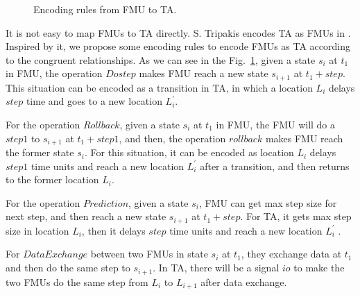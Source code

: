 \begin{figure}[htbp]
	\caption{Encoding rules from FMU to TA.}
	\label{fmutota}
\end{figure}

It is not easy to map FMUs to TA directly. S. Tripakis encodes TA as FMUs in \cite{Tripakis15}. Inspired by it, we propose some encoding rules to encode FMUs as TA according to the congruent relationships. As we can see in the Fig.~\ref{fmutota}, given a state $s_{i}$ at $t_{1}$ in FMU, the operation $Dostep$ makes FMU reach a new state $s_{i+1}$ at $t_{1}+step$. This situation can be encoded as a transition in TA, in which a location $L_{i}$ delays $step$ time and goes to a new location $L_{i}^{\prime}$.

For the operation $Rollback$, given a state $s_{i}$ at $t_{1}$ in FMU, the FMU will do a $step1$ to $s_{i+1}$ at $t_{1}+step1$, and then, the operation $rollback$ makes FMU reach the former state $s_{i}$. For this situation, it can be encoded as location $L_{i}$ delays $step1$ time units and reach a new location $L_{i}^{\prime}$ after a transition, and then returns to the former location $L_{i}$. 

For the operation $Prediction$, given a state $s_{i}$, FMU can get max step size for next step, and then reach a new state $s_{i+1}$ at $t_{1}+step$. For TA, it gets max step size in location $L_{i}$, then it delays $step$ time units and reach a new location $L_{i}^{\prime}$ .

For $Data Exchange$ between two FMUs in state $s_{i}$ at $t_{1}$, they exchange data at $t_{1}$ and then do the same step to $s_{i+1}$. In TA, there will be a signal $io$ to make the two FMUs do the same step from $L_{i}$ to $L_{i+1}$ after data exchange.

